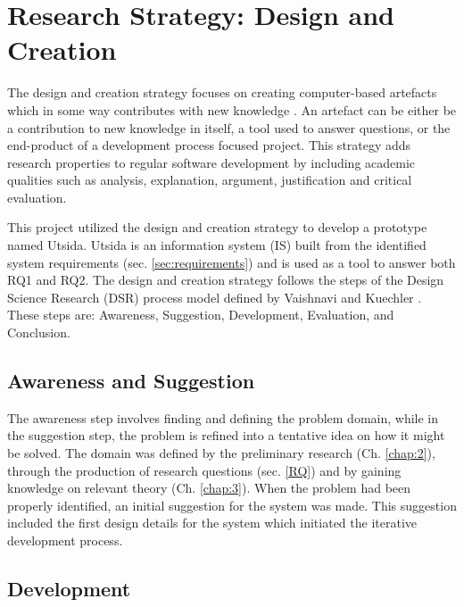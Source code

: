 \section{Research Strategy: Design and Creation}

The design and creation strategy focuses on creating computer-based artefacts which in some way contributes with new knowledge \cite{oates2005researching}. An artefact can be either be a contribution to new knowledge in itself, a tool used to answer questions, or the end-product of a development process focused project. This strategy adds research properties to regular software development by including academic qualities such as analysis, explanation, argument, justification and critical evaluation.

This project utilized the design and creation strategy to develop a prototype named Utsida. Utsida is an information system (IS) built from the identified system requirements (sec. \ref{sec:requirements}) and is used as a tool to answer both RQ1 and RQ2. The design and creation strategy follows the steps of the Design Science Research (DSR) process model defined by Vaishnavi and Kuechler \cite{vaishnavi2004design}. These steps are: Awareness, Suggestion, Development, Evaluation, and Conclusion.

\subsection{Awareness and Suggestion}
The awareness step involves finding and defining the problem domain, while in the suggestion step, the problem is refined into a tentative idea on how it might be solved. The domain was defined by the preliminary research (Ch. \ref{chap:2}), through the production of research questions (sec. \ref{RQ}) and by gaining knowledge on relevant theory (Ch. \ref{chap:3}). When the problem had been properly identified, an initial suggestion for the system was made. This suggestion included the first design details for the system which initiated the iterative development process.

\subsection{Development}


